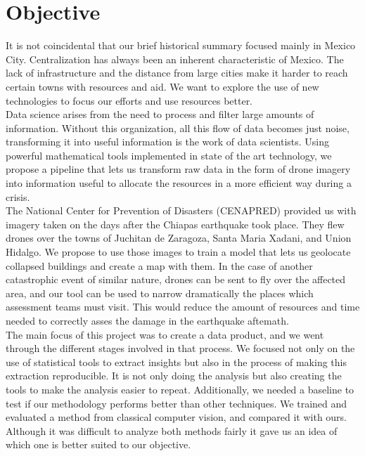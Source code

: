 \section{Objective}

It is not coincidental that our brief historical summary focused mainly in Mexico City. Centralization has always been an inherent characteristic of Mexico. The lack of infrastructure and the distance from large cities make it harder to reach certain towns with resources and aid. We want to explore the use of new technologies to focus our efforts and use resources better.\\

Data science arises from the need to process and filter large amounts of information. Without this organization, all this flow of data becomes just noise, transforming it into useful information is the work of data scientists. Using powerful mathematical tools implemented in state of the art technology, we propose a pipeline that lets us transform raw data in the form of drone imagery into information useful to allocate the resources in a more efficient way during a crisis.\\

The National Center for Prevention of Disasters (CENAPRED) provided us with imagery taken on the days after the Chiapas earthquake took place. They flew drones over the towns of Juchitan de Zaragoza, Santa Maria Xadani, and Union Hidalgo. We propose to use those images to train a model that lets us geolocate collapsed buildings and create a map with them. In the case of another catastrophic event of similar nature, drones can be sent to fly over the affected area, and our tool can be used to narrow dramatically the places which assessment teams must visit. This would reduce the amount of resources and time needed to correctly asses the damage in the earthquake aftemath.\\

The main focus of this project was to create a data product, and we went through the different stages involved in that process. We focused not only on the use of statistical tools to extract insights but also in the process of making this extraction reproducible. It is not only doing the analysis but also creating the tools to make the analysis easier to repeat. Additionally, we needed a baseline to test if our methodology performs better than other techniques. We trained and evaluated a method from classical computer vision, and compared it with ours. Although it was difficult to analyze both methods fairly it gave us an idea of which one is better suited to our objective.\\

